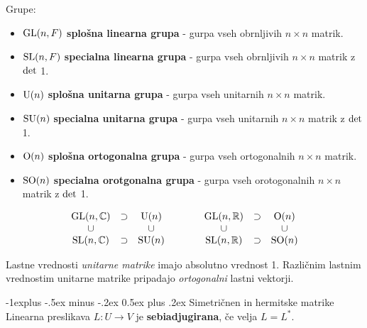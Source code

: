 \documentclass[a4paper,8pt]{extarticle}
\makeatletter
\renewcommand{\subsection}{\@startsection{subsection}{2}{0mm}%
                                {-1explus -.5ex minus -.2ex}%
                                {0.5ex plus .2ex}%
                                {\normalfont\normalsize\bfseries}}
\makeatother
\begin{document}
\begin{multicols}{3}
Grupe:
\begin{itemize}
    \item $\textmd{GL}(n,F)$ \textbf{splošna linearna grupa} - gurpa vseh obrnljivih $n \times n$ matrik.
    \item $\textmd{SL}(n,F)$ \textbf{specialna linearna grupa} - gurpa vseh obrnljivih $n \times n$ matrik z $\textmd{det}$ 1.
    \item $\textmd{U}(n)$ \textbf{splošna unitarna grupa} - gurpa vseh unitarnih $n \times n$ matrik.
    \item $\textmd{SU}(n)$ \textbf{specialna unitarna grupa} - gurpa vseh unitarnih $n \times n$ matrik z $\textmd{det}$ 1.
    \item $\textmd{O}(n)$ \textbf{splošna ortogonalna grupa} - gurpa vseh ortogonalnih $n \times n$ matrik.
    \item $\textmd{SO}(n)$ \textbf{specialna orotgonalna grupa} - gurpa vseh orotogonalnih $n \times n$ matrik z $\textmd{det}$ 1.
\end{itemize}

\begin{equation*}
    \begin{aligned}
        \begin{matrix}
            \textmd{GL}(n, \mathbb{C}) & \supset & \textmd{U}(n) \\
            \cup &  & \cup \\
            \textmd{SL}(n, \mathbb{C}) & \supset & \textmd{SU}(n) \\
        \end{matrix}
        \qquad \qquad
        \begin{matrix}
            \textmd{GL}(n, \mathbb{R}) & \supset & \textmd{O}(n) \\
            \cup &  & \cup \\
            \textmd{SL}(n, \mathbb{R}) & \supset & \textmd{SO}(n) \\
        \end{matrix}
    \end{aligned}
\end{equation*}

Lastne vrednosti \emph{unitarne matrike} imajo absolutno vrednost 1.
Različnim lastnim vrednostim unitarne matrike pripadajo \emph{ortogonalni} lastni vektorji.

\subsection{Simetričnen in hermitske matrike}
Linearna preslikava $L:U \to V$ je \textbf{sebiadjugirana}, če velja $L=L^*$. 


\end{multicols}
\end{document}
